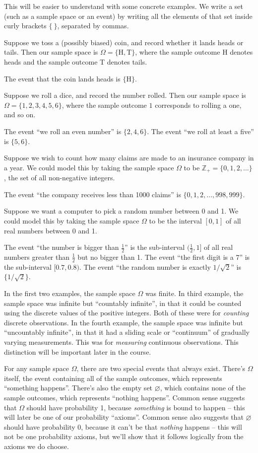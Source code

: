 \documentclass[
  letterpaper,
  DIV=11,
  numbers=noendperiod]{scrreprt}
\theoremstyle{remark}
\begin{document}
This will be easier to understand with some concrete examples. We write
a set (such as a sample space or an event) by writing all the elements
of that set inside curly brackets \(\{\ \}\), separated by commas.

Suppose we toss a (possibly biased) coin, and record whether it lands
heads or tails. Then our sample space is
\(\Omega = \{\mathrm H, \mathrm T\}\), where the sample outcome H
denotes heads and the sample outcome T denotes tails.

The event that the coin lands heads is \(\{\mathrm H\}\).

Suppose we roll a dice, and record the number rolled. Then our sample
space is \(\Omega = \{1,2,3,4,5,6\}\), where the sample outcome \(1\)
corresponds to rolling a one, and so on.

The event ``we roll an even number'' is \(\{2,4,6\}\). The event ``we
roll at least a five'' is \(\{5,6\}\).

Suppose we wish to count how many claims are made to an insurance
company in a year. We could model this by taking the sample space
\(\Omega\) to be \(\mathbb Z_+ = \{0, 1, 2, \dots\}\), the set of all
non-negative integers.

The event ``the company receives less than 1000 claims'' is
\(\{0, 1, 2, \dots, 998, 999\}\).

Suppose we want a computer to pick a random number between 0 and 1. We
could model this by taking the sample space \(\Omega\) to be the
interval \([0, 1]\) of all real numbers between 0 and 1.

The event ``the number is bigger than \(\frac12\)'' is the sub-interval
\((\frac12, 1]\) of all real numbers greater than \(\frac12\) but no
bigger than 1. The event ``the first digit is a 7'' is the sub-interval
\([0.7, 0.8)\). The event ``the random number is exactly
\(1/\sqrt{2}\)'' is \(\{1/\sqrt{2}\}\).

In the first two examples, the sample space \(\Omega\) was finite. In
third example, the sample space was infinite but ``countably infinite'',
in that it could be counted using the discrete values of the positive
integers. Both of these were for \emph{counting} discrete observations.
In the fourth example, the sample space was infinite but ``uncountably
infinite'', in that it had a sliding scale or ``continuum'' of gradually
varying measurements. This was for \emph{measuring} continuous
observations. This distinction will be important later in the course.

For any sample space \(\Omega\), there are two special events that
always exist. There's \(\Omega\) itself, the event containing all of the
sample outcomes, which represents ``something happens''. There's also
the empty set \(\varnothing\), which contains none of the sample
outcomes, which represents ``nothing happens''. Common sense suggests
that \(\Omega\) should have probability 1, because \emph{something} is
bound to happen -- this will later be one of our probability ``axioms''.
Common sense also suggests that \(\varnothing\) should have probability
0, because it can't be that \emph{nothing} happens -- this will not be
one probability axioms, but we'll show that it follows logically from
the axioms we do choose.
\end{document}
